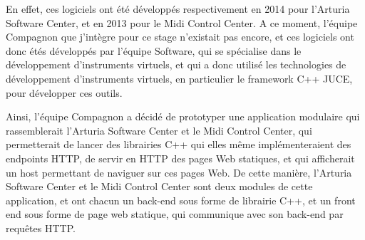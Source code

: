 \documentclass[francais]{rapportPFE}  %
\begin{document}
En effet, ces logiciels ont été développés respectivement en 2014 pour l'Arturia Software Center, et en 2013 pour le Midi Control Center. A ce moment, l'équipe Compagnon que j'intègre pour ce stage n'existait pas encore, et ces logiciels ont donc étés développés par l'équipe Software, qui se spécialise dans le développement d'instruments virtuels, et qui a donc utilisé les technologies de développement d'instruments virtuels, en particulier le framework C++ JUCE, pour développer ces outils. 

Ainsi, l'équipe Compagnon a décidé de prototyper une application modulaire qui rassemblerait l'Arturia Software Center et le Midi Control Center, qui permetterait de lancer des librairies C++ qui elles même implémenteraient des endpoints HTTP, de servir en HTTP des pages Web statiques, et qui afficherait un host permettant de naviguer sur ces pages Web. De cette manière, l'Arturia Software Center et le Midi Control Center sont deux modules de cette application, et ont chacun un back-end sous forme de librairie C++, et un front end sous forme de page web statique, qui communique avec son back-end par requêtes HTTP.\\
\end{document}
